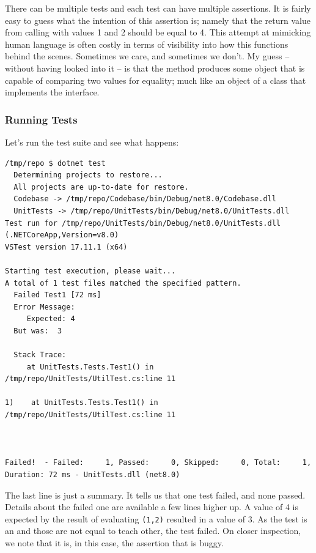 \inputminted[highlightlines={11}, highlightcolor=yellow]{csharp}{../src/csharp/test/linking/UnitTests/UtilTest.cs}

There can be multiple tests and each test can have multiple assertions. It is fairly easy to guess what the intention of this assertion is; namely that the return value from calling  with values 1 and 2 should be equal to 4. This attempt at mimicking human language is often costly in terms of visibility into how this functions behind the scenes. Sometimes we care, and sometimes we don't. My guess -- without having looked into it -- is that the  method produces some object that is capable of comparing two values for equality; much like an object of a class that implements the  interface.

\subsubsection{Running Tests}

Let's run the test suite and see what happens:

\begin{verbatim}
/tmp/repo $ dotnet test
  Determining projects to restore...
  All projects are up-to-date for restore.
  Codebase -> /tmp/repo/Codebase/bin/Debug/net8.0/Codebase.dll
  UnitTests -> /tmp/repo/UnitTests/bin/Debug/net8.0/UnitTests.dll
Test run for /tmp/repo/UnitTests/bin/Debug/net8.0/UnitTests.dll (.NETCoreApp,Version=v8.0)
VSTest version 17.11.1 (x64)

Starting test execution, please wait...
A total of 1 test files matched the specified pattern.
  Failed Test1 [72 ms]
  Error Message:
     Expected: 4
  But was:  3

  Stack Trace:
     at UnitTests.Tests.Test1() in /tmp/repo/UnitTests/UtilTest.cs:line 11

1)    at UnitTests.Tests.Test1() in /tmp/repo/UnitTests/UtilTest.cs:line 11



Failed!  - Failed:     1, Passed:     0, Skipped:     0, Total:     1, Duration: 72 ms - UnitTests.dll (net8.0)
\end{verbatim}

The last line is just a summary. It tells us that one test failed, and none passed. Details about the failed one are available a few lines higher up. A value of 4 is expected by the result of evaluating \texttt{(1,2)} resulted in a value of 3. As the test is an  and those are not equal to teach other, the test failed. On closer inspection, we note that it is, in this case, the assertion that is buggy.

